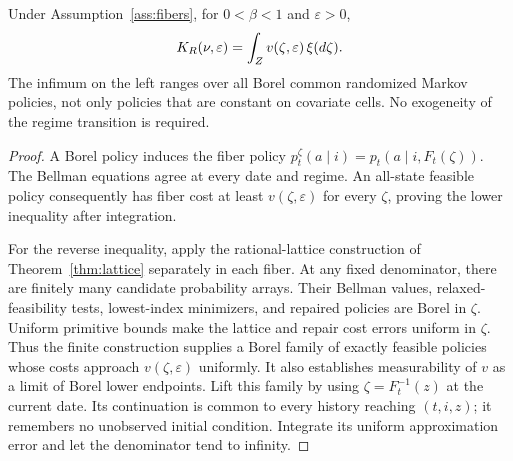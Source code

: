 \begin{theorem}\label{thm:fibers}
Under Assumption~\ref{ass:fibers}, for $0<\beta<1$ and $\varepsilon>0$,
\begin{equation}\label{eq:fiber-identity}
 K_R(\nu,\varepsilon)=\int_Z v(\zeta,\varepsilon)\,\xi(d\zeta).
\end{equation}
The infimum on the left ranges over all Borel common randomized Markov policies, not only policies that are constant on covariate cells. No exogeneity of the regime transition is required.
\end{theorem}
\begin{proof}
A Borel policy induces the fiber policy $p_t^\zeta(a\mid i)=p_t(a\mid i,F_t(\zeta))$. The Bellman equations agree at every date and regime. An all-state feasible policy consequently has fiber cost at least $v(\zeta,\varepsilon)$ for every $\zeta$, proving the lower inequality after integration.

For the reverse inequality, apply the rational-lattice construction of Theorem~\ref{thm:lattice} separately in each fiber. At any fixed denominator, there are finitely many candidate probability arrays. Their Bellman values, relaxed-feasibility tests, lowest-index minimizers, and repaired policies are Borel in $\zeta$. Uniform primitive bounds make the lattice and repair cost errors uniform in $\zeta$. Thus the finite construction supplies a Borel family of exactly feasible policies whose costs approach $v(\zeta,\varepsilon)$ uniformly. It also establishes measurability of $v$ as a limit of Borel lower endpoints. Lift this family by using $\zeta=F_t^{-1}(z)$ at the current date. Its continuation is common to every history reaching $(t,i,z)$; it remembers no unobserved initial condition. Integrate its uniform approximation error and let the denominator tend to infinity.
\end{proof}

